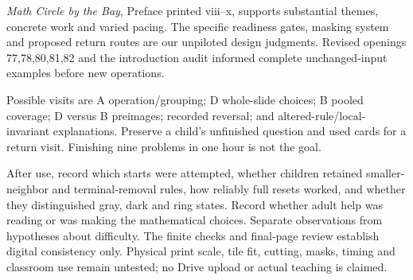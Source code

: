 \documentclass[11pt]{article}
\begin{document}
\emph{Math Circle by the Bay}, Preface printed viii--x, supports substantial themes, concrete work and varied pacing. The specific readiness gates, masking system and proposed return routes are our unpiloted design judgments. Revised openings 77,78,80,81,82 and the introduction audit informed complete unchanged-input examples before new operations.

Possible visits are A operation/grouping; D whole-slide choices; B pooled coverage; D versus B preimages; recorded reversal; and altered-rule/local-invariant explanations. Preserve a child's unfinished question and used cards for a return visit. Finishing nine problems in one hour is not the goal.

After use, record which starts were attempted, whether children retained smaller-neighbor and terminal-removal rules, how reliably full resets worked, and whether they distinguished gray, dark and ring states. Record whether adult help was reading or was making the mathematical choices. Separate observations from hypotheses about difficulty. The finite checks and final-page review establish digital consistency only. Physical print scale, tile fit, cutting, masks, timing and classroom use remain untested; no Drive upload or actual teaching is claimed.
\end{document}
